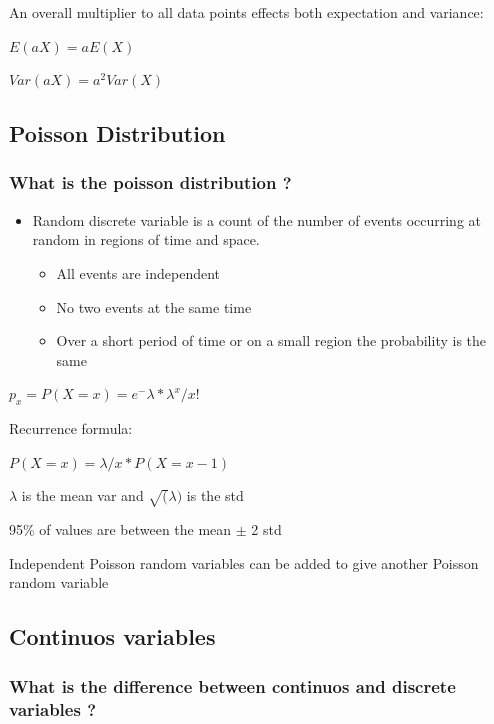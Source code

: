 \documentclass[
]{article}
\providecommand{\tightlist}{%
  \setlength{\itemsep}{0pt}\setlength{\parskip}{0pt}}
\begin{document}
An overall multiplier to all data points effects both expectation and
variance:

\(E(aX) = aE(X)\)

\(Var(aX) = a^2Var(X)\)

\hypertarget{poisson-distribution}{%
\subsection{Poisson Distribution}\label{poisson-distribution}}

\hypertarget{what-is-the-poisson-distribution}{%
\subsubsection{What is the poisson distribution
?}\label{what-is-the-poisson-distribution}}

\begin{itemize}
\tightlist
\item
  Random discrete variable is a count of the number of events occurring
  at random in regions of time and space.

  \begin{itemize}
  \tightlist
  \item
    All events are independent
  \item
    No two events at the same time
  \item
    Over a short period of time or on a small region the probability is
    the same
  \end{itemize}
\end{itemize}

\(p_x = P(X=x) = e^-\lambda *\lambda^x/x!\)

Recurrence formula:

\(P(X=x) = \lambda/x * P(X= x-1)\)

\(\lambda\) is the mean var and \(\sqrt(\lambda)\) is the std

95\% of values are between the mean \(\pm\) 2 std

Independent Poisson random variables can be added to give another
Poisson random variable

\hypertarget{continuos-variables}{%
\subsection{Continuos variables}\label{continuos-variables}}

\hypertarget{what-is-the-difference-between-continuos-and-discrete-variables}{%
\subsubsection{What is the difference between continuos and discrete
variables
?}\label{what-is-the-difference-between-continuos-and-discrete-variables}}
\end{document}
